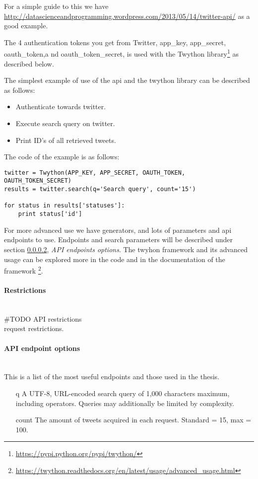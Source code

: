 For a simple guide to this we have
\url{http://datascienceandprogramming.wordpress.com/2013/05/14/twitter-api/} as
a good example.

The 4 authentication tokens you get from Twitter, app\_key, app\_secret, oauth\_token,a nd
oauth\_token\_secret, is used with the Twython
library\footnote{\url{https://pypi.python.org/pypi/twython/}} as described
below.

The simplest example of use of the api and the twython library can be described
as follows:
\begin{itemize}
	\item Authenticate towards twitter.
	\item Execute search query on twitter.
	\item Print ID's of all retrieved tweets.
\end{itemize} 

The code of the example is as follows:
\begin{listing}
\begin{verbatim}
twitter = Twython(APP_KEY, APP_SECRET, OAUTH_TOKEN, OAUTH_TOKEN_SECRET)
results = twitter.search(q='Search query', count='15')

for status in results['statuses']:
    print status['id']
\end{verbatim}
\end{listing}

For more advanced use we have generators, and lots of parameters and api
endpoints to use. Endpoints and search parameters will be described under
section \ref{data:twitter:endpoints}, \textit{API endpoints options}. 
The twyhon framework and its advanced usage can be explored more in the code and
in the documentation of the framework
\footnote{\url{https://twython.readthedocs.org/en/latest/usage/advanced_usage.html}}.
%

\paragraph{Restrictions}
\hspace{0pt}\\
#TODO API restrictions\\
request restrictions.
%

\paragraph{API endpoint options}\label{data:twitter:endpoints}
\hspace{0pt}\\
This is a list of the most useful endpoints and those used in the thesis.
\begin{itemize}
\item[q] A UTF-8, URL-encoded search query of 1,000 characters maximum, including
operators. Queries may additionally be limited by complexity.

\item[count] The amount of tweets acquired in each request. Standard = 15, max
= 100. 

\end{itemize}
%

